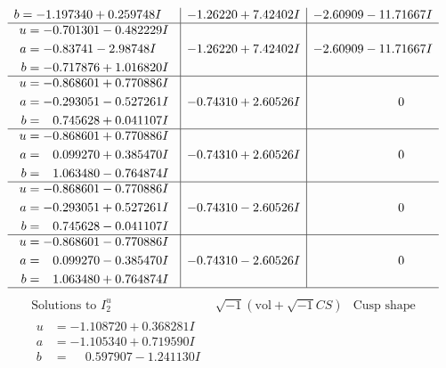 \documentclass[1p]{elsarticle_modified}
\theoremstyle{definition}
\newcommand{\I}{\sqrt{-1}}
\begin{document}
$$\begin{array}{c|c|c}
\begin{aligned}
b &= -1.197340 + 0.259748 I\end{aligned}
 & -1.26220 + 7.42402 I & -2.60909 - 11.71667 I \\ \hline\begin{aligned}
u &= -0.701301 - 0.482229 I \\
a &= -0.83741 - 2.98748 I \\
b &= -0.717876 + 1.016820 I\end{aligned}
 & -1.26220 + 7.42402 I & -2.60909 - 11.71667 I \\ \hline\begin{aligned}
u &= -0.868601 + 0.770886 I \\
a &= -0.293051 - 0.527261 I \\
b &= \phantom{-}0.745628 + 0.041107 I\end{aligned}
 & -0.74310 + 2.60526 I & \phantom{-0.000000 } 0 \\ \hline\begin{aligned}
u &= -0.868601 + 0.770886 I \\
a &= \phantom{-}0.099270 + 0.385470 I \\
b &= \phantom{-}1.063480 - 0.764874 I\end{aligned}
 & -0.74310 + 2.60526 I & \phantom{-0.000000 } 0 \\ \hline\begin{aligned}
u &= -0.868601 - 0.770886 I \\
a &= -0.293051 + 0.527261 I \\
b &= \phantom{-}0.745628 - 0.041107 I\end{aligned}
 & -0.74310 - 2.60526 I & \phantom{-0.000000 } 0 \\ \hline\begin{aligned}
u &= -0.868601 - 0.770886 I \\
a &= \phantom{-}0.099270 - 0.385470 I \\
b &= \phantom{-}1.063480 + 0.764874 I\end{aligned}
 & -0.74310 - 2.60526 I & \phantom{-0.000000 } 0\\
 \hline 
 \end{array}$$\newpage$$\begin{array}{c|c|c}  
\text{Solutions to }I^u_{2}& \I (\text{vol} + \sqrt{-1}CS) & \text{Cusp shape}\\
 \hline 
\begin{aligned}
u &= -1.108720 + 0.368281 I \\
a &= -1.105340 + 0.719590 I \\
b &= \phantom{-}0.597907 - 1.241130 I\end{aligned}

\end{array}$$
\end{document}
